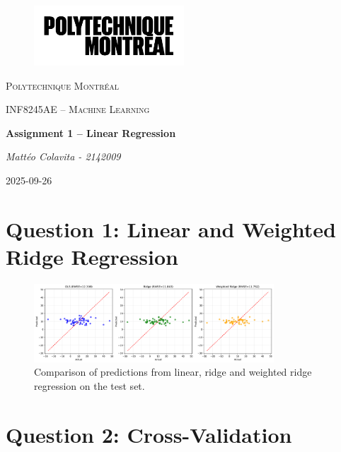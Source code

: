 \documentclass[11pt, a4paper]{report}
\begin{document}
\begin{titlepage}
    \centering
    \begin{figure}[h]
        \centering
        \includegraphics[width=0.5\textwidth]{./assets/logo_polymtl.png}
        \label{fig:logo_polymtl}
    \end{figure}

    {\scshape\LARGE Polytechnique Montréal \par}
    \vspace{1cm}
    {\scshape\Large INF8245AE – Machine Learning \par}
    \vspace{4cm}
    {\huge\bfseries Assignment 1 – Linear Regression\par}
    \vspace{2cm}
    {\Large\itshape Mattéo Colavita - 2142009\par}
    \vfill
    \vspace{0.8cm}
    {\large 2025-09-26\par}
\end{titlepage}

\section{Question 1: Linear and Weighted Ridge Regression}

\begin{figure}
\centering
\includegraphics[width=0.8\textwidth]{./assets/regression_comparison.png}
\caption{Comparison of predictions from linear, ridge and weighted ridge regression on the test set.}
\label{fig:linear_vs_weighted_ridge}
\end{figure}

\section{Question 2: Cross-Validation}
\end{document}
